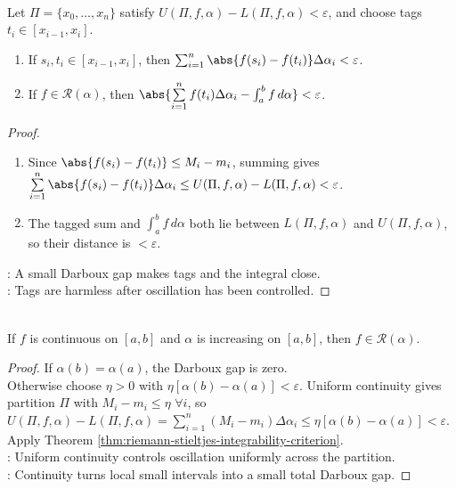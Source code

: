 \begin{theorem} \label{thm:tagged-riemann-stieltjes-sums} \\
Let $\Pi=\{x_0,\ldots,x_n\}$ satisfy $U(\Pi,f,\alpha)-L(\Pi,f,\alpha)<\varepsilon$, and choose tags $t_i\in[x_{i-1},x_i]$.
\begin{enumerate}[label=(\roman*)]
\setlength{\itemsep}{0pt}
\item If $s_i,t_i\in[x_{i-1},x_i]$, then $\sum_{i=1}^{n}\abs{f(s_i)-f(t_i)}\Delta\alpha_i<\varepsilon$.
\item If $f\in\mathcal{R}(\alpha)$, then $\abs{\sum\limits_{i=1}^{n} f(t_i)\Delta\alpha_i-\int_a^b f\,d\alpha}<\varepsilon$.
\end{enumerate}
\begin{proof}
\begin{enumerate}[label=(\roman*)]
\setlength{\itemsep}{0pt}
\item Since $\abs{f(s_i)-f(t_i)}\leq M_i-m_i$, summing gives $\sum\limits_{i=1}^{n}\abs{f(s_i)-f(t_i)}\Delta\alpha_i \leq U(\Pi,f,\alpha)-L(\Pi,f,\alpha)<\varepsilon$.
\item The tagged sum and $\int_a^b f\,d\alpha$ both lie between $L(\Pi,f,\alpha)$ and $U(\Pi,f,\alpha)$, so their distance is $<\varepsilon$.
\end{enumerate}
: A small Darboux gap makes tags and the integral close.\\
: Tags are harmless after oscillation has been controlled.
\end{proof}
\end{theorem}

\begin{theorem} \label{thm:continuous-functions-riemann-stieltjes-integrable} \\
If $f$ is continuous on $[a,b]$ and $\alpha$ is increasing on $[a,b]$, then $f\in\mathcal{R}(\alpha)$.
\begin{proof}
If $\alpha(b)=\alpha(a)$, the Darboux gap is zero.\\
Otherwise choose $\eta>0$ with $\eta[\alpha(b)-\alpha(a)]<\varepsilon$. Uniform continuity gives partition $\Pi$ with $M_i-m_i\leq\eta$ $\forall i$, so $U(\Pi,f,\alpha)-L(\Pi,f,\alpha)=\sum\limits_{i=1}^{n}(M_i-m_i)\Delta\alpha_i \leq \eta[\alpha(b)-\alpha(a)]<\varepsilon$. Apply Theorem \ref{thm:riemann-stieltjes-integrability-criterion}.\\
: Uniform continuity controls oscillation uniformly across the partition.\\
: Continuity turns local small intervals into a small total Darboux gap.
\end{proof}
\end{theorem}

